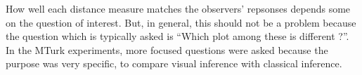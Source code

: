 \documentclass[12]{article}
\newcommand{\red}[1]{{\color{red} #1}}
\newcommand{\green}[1]{{\color{cyan} #1}}
\begin{document}
How well each distance measure matches the observers' repsonses depends some on the question of interest. But, in general, this should not be a problem because the question which is typically asked is ``Which plot among these is different ?''. In the MTurk experiments, more focused questions were asked because the purpose was very specific, to compare visual inference with classical inference.
%
%
\end{document}
